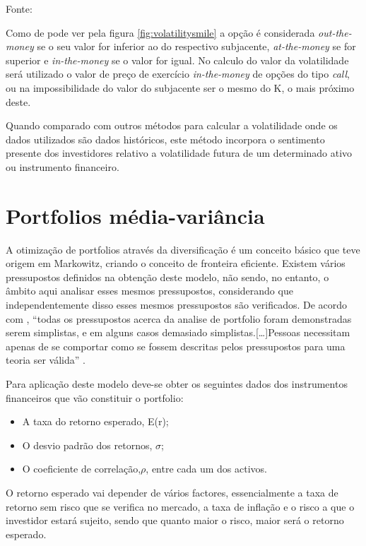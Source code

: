 \documentclass[
  12pt,
  a4paper,
  openany]{book}
\providecommand{\tightlist}{%
  \setlength{\itemsep}{0pt}\setlength{\parskip}{0pt}}
\begin{document}
Fonte: \citep[pp.182]{volatilitysmile}

\justifying
\bigskip

Como de pode ver pela figura \ref{fig:volatilitysmile} a opção é considerada \emph{out-the-money} se o seu valor for inferior ao do respectivo subjacente, \emph{at-the-money} se for superior e \emph{in-the-money} se o valor for igual. No calculo do valor da volatilidade será utilizado o valor de preço de exercício \emph{in-the-money} de opções do tipo \emph{call}, ou na impossibilidade do valor do subjacente ser o mesmo do K, o mais próximo deste.

Quando comparado com outros métodos para calcular a volatilidade onde os dados utilizados são dados históricos, este método incorpora o sentimento presente dos investidores relativo a volatilidade futura de um determinado ativo ou instrumento financeiro.

\hypertarget{portfolios-muxe9dia-variuxe2ncia}{%
\section{Portfolios média-variância}\label{portfolios-muxe9dia-variuxe2ncia}}

A otimização de portfolios através da diversificação é um conceito básico que teve origem em Markowitz, criando o conceito de fronteira eficiente. Existem vários pressupostos definidos na obtenção deste modelo, não sendo, no entanto, o âmbito aqui analisar esses mesmos pressupostos, considerando que independentemente disso esses mesmos pressupostos são verificados. De acordo com \citet{Modern2013}, ``todas os pressupostos acerca da analise de portfolio foram demonstradas serem simplistas, e em alguns casos demasiado simplistas.{[}\ldots{]}Pessoas necessitam apenas de se comportar como se fossem descritas pelos pressupostos para uma teoria ser válida'' \citep[pp.5]{Modern2013}.

Para aplicação deste modelo deve-se obter os seguintes dados dos instrumentos financeiros que vão constituir o portfolio:

\begin{itemize}
\tightlist
\item
  A taxa do retorno esperado, E(r);
\item
  O desvio padrão dos retornos, \(\sigma\);
\item
  O coeficiente de correlação,\(\rho\), entre cada um dos activos.
\end{itemize}

O retorno esperado vai depender de vários factores, essencialmente a taxa de retorno sem risco que se verifica no mercado, a taxa de inflação e o risco a que o investidor estará sujeito, sendo que quanto maior o risco, maior será o retorno esperado.
\end{document}
